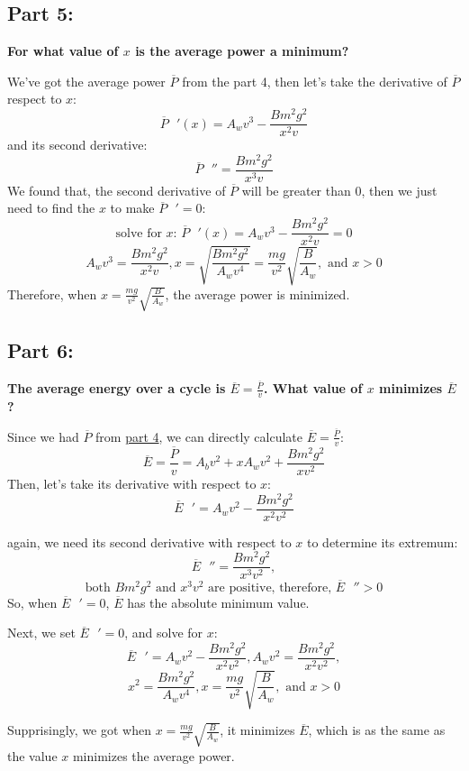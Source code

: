\documentclass{article}
\begin{document}
\subsection*{Part 5:}
{\large \bfseries For what value of \(x\) is the average power a minimum?
}\setlength{\parskip}{1em}

We've got the average power \(\overline{P}\) from the part 4, then let's take the derivative of \(\overline{P}\) respect to \(x\):
\[\overline{P}\text{ }'(x)= A_wv^3-\frac{Bm^2g^2}{x^2v}\]
and its second derivative:
\[\overline{P}\text{ }'' = \frac{Bm^2g^2}{x^3v}\]
We found that, the second derivative of \(\overline{P}\) will be greater than \(0\), then we just need to find the \(x\) to make  \(\overline{P}\text{ }' = 0\):
\[\text{solve for }x \text{: }\overline{P}\text{ }'(x)= A_wv^3-\frac{Bm^2g^2}{x^2v} =0 \]
\[A_wv^3 = \frac{Bm^2g^2}{x^2v}, x = \sqrt{\frac{Bm^2g^2}{A_wv^4}} = \frac{mg}{v^2}\sqrt{\frac{B}{A_w}},\text{ and }x > 0\]
Therefore, when \(x = \frac{mg}{v^2}\sqrt{\frac{B}{A_w}}\), the average power is minimized.

\subsection*{Part 6:}
{\large \bfseries The average energy over a cycle is \(\overline{E} = \frac{\overline{P}}{v}\). What value of \(x\) minimizes \(\overline{E}\) ?}

Since we had \(\overline{P}\) from \hyperref[sec:part4]{part 4}, we can directly calculate \(\overline{E} = \frac{\overline{P}}{v}\):
\[\overline{E} = \frac{\overline{P}}{v}=  A_bv^2+xA_wv^2 + \frac{Bm^2g^2}{xv^2} \]
Then, let's take its derivative with respect to \(x\):
\[\overline{E}\text{ }' = A_wv^2-\frac{Bm^2g^2}{x^2v^2}\]

again, we need its second derivative with respect to \(x\) to determine its extremum:
\[\overline{E}\text{ }'' = \frac{Bm^2g^2}{x^3v^2},\]
\[\text{both }Bm^2g^2 \text{ and } x^3v^2 \text{ are positive, therefore, } \overline{E} \text{ }'' > 0\]
So, when \(\overline{E}\text{ }' = 0\), \(\overline{E}\) has the absolute minimum value.

Next, we set \(\overline{E}\text{ }' = 0\), and solve for \(x\):
\[\overline{E}\text{ }' = A_wv^2-\frac{Bm^2g^2}{x^2v^2}, A_wv^2 = \frac{Bm^2g^2}{x^2v^2},\]
\[x^2=\frac{Bm^2g^2}{A_wv^4}, x = \frac{mg}{v^2}\sqrt{\frac{B}{A_w}},\text{ and }x > 0\]

Supprisingly, we got when \(x = \frac{mg}{v^2}\sqrt{\frac{B}{A_w}}\), it minimizes \(\overline{E}\), which is as the same as the value \(x\) minimizes the average power.
\end{document}
